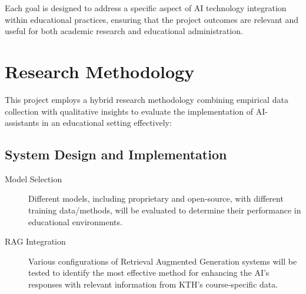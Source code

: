 Each goal is designed to address a specific aspect of AI technology integration within educational practices, ensuring that the project outcomes are relevant and useful for both academic research and educational administration.






\section{Research Methodology}
\label{sec:research_methodology}




This project employs a hybrid research methodology combining empirical data collection with qualitative insights to evaluate the implementation of AI-assistants in an educational setting effectively:


\subsection{System Design and Implementation}
\begin{description}
        \item[Model Selection] Different models, including proprietary and open-source, with different training data/methods, will be evaluated to determine their performance in educational environments.
        \item[RAG Integration] Various configurations of Retrieval Augmented Generation systems will be tested to identify the most effective method for enhancing the AI's responses with relevant information from KTH’s course-specific data.
\end{description}



